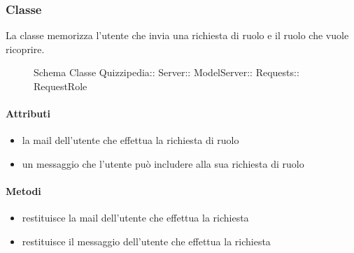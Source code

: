 \subsubsection{Classe }
La classe memorizza l'utente che invia una richiesta di ruolo e il ruolo che vuole ricoprire.
\begin{figure}[H]
\centering
\noindent{}
\caption[Schema Classe RequestRole]{Schema Classe Quizzipedia:: Server:: ModelServer:: Requests:: RequestRole}
\end{figure}
\paragraph{Attributi}
\begin{itemize}
\item {}
\newline
la mail dell'utente che effettua la richiesta di ruolo
\item {}
\newline
un messaggio che l'utente può includere alla sua richiesta di ruolo
\end{itemize}
\paragraph{Metodi}
\begin{itemize}
\item {}
\newline
restituisce la mail dell'utente che effettua la richiesta
\newline
\item {}
\newline
restituisce il messaggio dell'utente che effettua la richiesta
\newline
\end{itemize}
